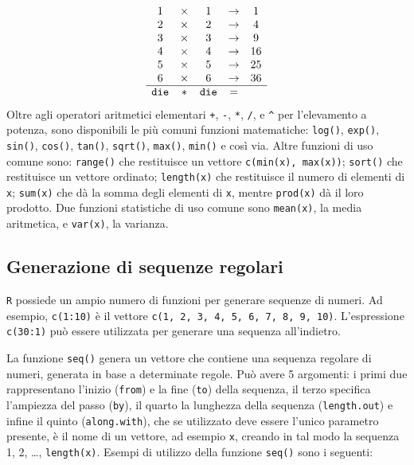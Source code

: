\documentclass[
]{memoir}
\theoremstyle{definition}
\theoremstyle{definition}
\theoremstyle{definition}
\theoremstyle{definition}
\theoremstyle{remark}
\begin{document}
\[
\begin{array}{ccccc}
1 & \times & 1 & \to & 1 \\
2 & \times & 2 & \to & 4 \\
3 & \times & 3 & \to & 9 \\
4 & \times & 4 & \to & 16 \\
5 & \times & 5 & \to & 25 \\
6 & \times & 6 & \to & 36 \\
\hline
\verb+die+ & * & \verb+die+ & = & 
\end{array}
\]
Oltre agli operatori aritmetici elementari \texttt{+}, \texttt{-}, \texttt{*}, \texttt{/}, e \texttt{\^{}} per
l'elevamento a potenza, sono disponibili le più comuni funzioni
matematiche: \texttt{log()}, \texttt{exp()}, \texttt{sin()}, \texttt{cos()}, \texttt{tan()}, \texttt{sqrt()},
\texttt{max()}, \texttt{min()} e così via. Altre funzioni di uso comune sono:
\texttt{range()} che restituisce un vettore \texttt{c(min(x),\ max(x))}; \texttt{sort()} che
restituisce un vettore ordinato; \texttt{length(x)} che restituisce il numero
di elementi di \texttt{x}; \texttt{sum(x)} che dà la somma degli elementi di \texttt{x},
mentre \texttt{prod(x)} dà il loro prodotto. Due funzioni statistiche di uso
comune sono \texttt{mean(x)}, la media aritmetica, e \texttt{var(x)}, la varianza.

\hypertarget{generazione-di-sequenze-regolari}{%
\subsection{Generazione di sequenze regolari}\label{generazione-di-sequenze-regolari}}

\texttt{R} possiede un ampio numero di funzioni per generare sequenze di numeri.
Ad esempio, \texttt{c(1:10)} è il vettore \texttt{c(1,\ 2,\ 3,\ 4,\ 5,\ 6,\ 7,\ 8,\ 9,\ 10)}.
L'espressione \texttt{c(30:1)} può essere utilizzata per generare una sequenza
all'indietro.

La funzione \texttt{seq()} genera un vettore che contiene una sequenza regolare
di numeri, generata in base a determinate regole. Può avere 5 argomenti:
i primi due rappresentano l'inizio (\texttt{from}) e la fine (\texttt{to}) della
sequenza, il terzo specifica l'ampiezza del passo (\texttt{by}), il quarto la
lunghezza della sequenza (\texttt{length.out}) e infine il quinto
(\texttt{along.with}), che se utilizzato deve essere l'unico parametro
presente, è il nome di un vettore, ad esempio \texttt{x}, creando in tal modo
la sequenza 1, 2, \ldots, \texttt{length(x)}. Esempi di utilizzo della funzione
\texttt{seq()} sono i seguenti:
\end{document}
